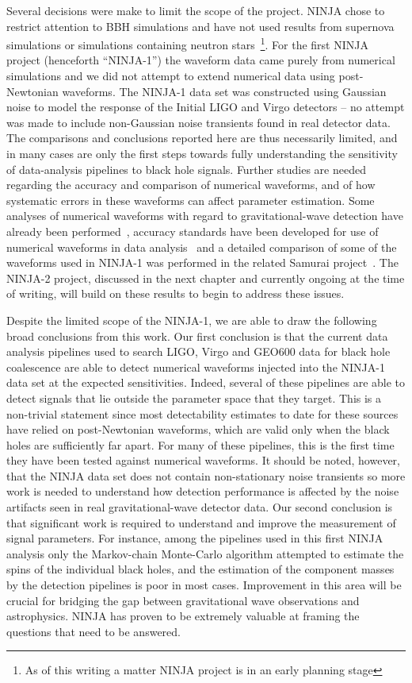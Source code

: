 Several decisions were make to limit the scope of the project.  NINJA
chose to restrict attention to BBH simulations and have not used
results from supernova simulations or simulations containing neutron
stars~\footnote{As of this writing a matter NINJA project is in an
early planning stage}.  For the first NINJA project (henceforth
``NINJA-1'') the waveform data came purely from numerical simulations
and we did not attempt to extend numerical data using post-Newtonian
waveforms.  The NINJA-1 data set was constructed using Gaussian noise
to model the response of the Initial LIGO and Virgo detectors -- no
attempt was made to include non-Gaussian noise transients found in
real detector data.  The comparisons and conclusions reported here are
thus necessarily limited, and in many cases are only the first steps
towards fully understanding the sensitivity of data-analysis pipelines
to black hole signals.  Further studies are needed regarding the
accuracy and comparison of numerical waveforms, and of how systematic
errors in these waveforms can affect parameter estimation.  Some
analyses of numerical waveforms with regard to gravitational-wave
detection have already been
performed~\cite{Baumgarte:2006en,Vaishnav:2007nm,Pan:2007nw,Boyle:2009dg},
accuracy standards have been developed for use of numerical waveforms
in data analysis~\cite{Lindblom:2008cm} and a detailed comparison of
some of the waveforms used in NINJA-1 was performed in the related
Samurai project~\cite{Hannam:2009hh}.  The NINJA-2 project, discussed
in the next chapter and currently ongoing at the time of writing, will
build on these results to begin to address these issues.  

Despite the limited scope of the NINJA-1, we are able to draw the
following broad conclusions from this work.  Our first conclusion is
that the current data analysis pipelines used to search LIGO, Virgo
and GEO600 data for black hole coalescence are able to detect
numerical waveforms injected into the NINJA-1 data set at the expected
sensitivities. Indeed, several of these pipelines are able to detect
signals that lie outside the parameter space that they target.  This
is a non-trivial statement since most detectability estimates to date
for these sources have relied on post-Newtonian waveforms, which are
valid only when the black holes are sufficiently far apart. For many
of these pipelines, this is the first time they have been tested
against numerical waveforms. It should be noted, however, that the
NINJA data set does not contain non-stationary noise transients so
more work is needed to understand how detection performance is
affected by the noise artifacts seen in real gravitational-wave
detector data. Our second conclusion is that significant work is
required to understand and improve the measurement of signal
parameters.  For instance, among the pipelines used in this first
NINJA analysis only the Markov-chain Monte-Carlo algorithm attempted
to estimate the spins of the individual black holes, and the
estimation of the component masses by the detection pipelines is poor
in most cases.  Improvement in this area will be crucial for bridging
the gap between gravitational wave observations and astrophysics.
NINJA has proven to be extremely valuable at framing the questions
that need to be answered.

